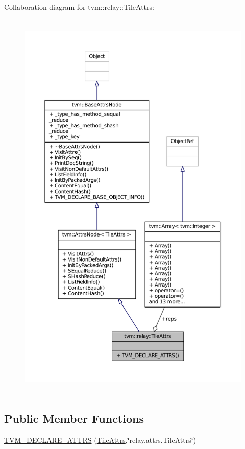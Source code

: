 Collaboration diagram for tvm\+:\+:relay\+:\+:Tile\+Attrs\+:
\nopagebreak
\begin{figure}[H]
\begin{center}
\leavevmode
\includegraphics[height=550pt]{structtvm_1_1relay_1_1TileAttrs__coll__graph}
\end{center}
\end{figure}
\subsection*{Public Member Functions}
\begin{DoxyCompactItemize}
\item 
\hyperlink{structtvm_1_1relay_1_1TileAttrs_a75c0e110298aad35ad7697b6f17740ae}{T\+V\+M\+\_\+\+D\+E\+C\+L\+A\+R\+E\+\_\+\+A\+T\+T\+RS} (\hyperlink{structtvm_1_1relay_1_1TileAttrs}{Tile\+Attrs},\char`\"{}relay.\+attrs.\+Tile\+Attrs\char`\"{})
\end{DoxyCompactItemize}
